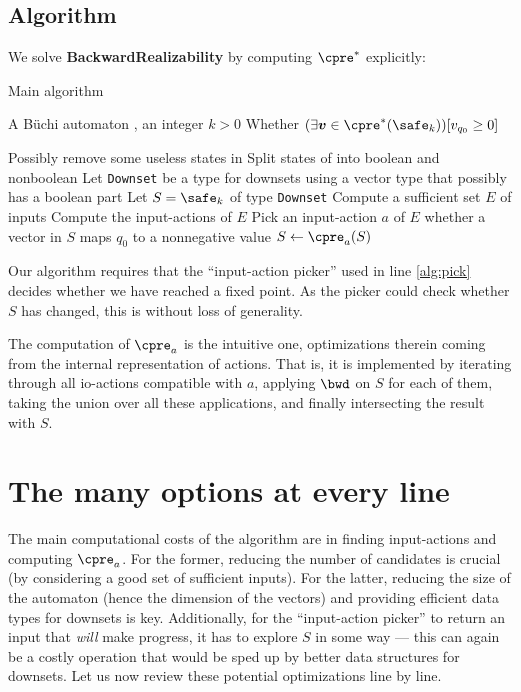 \documentclass[runningheads,a4paper]{llncs}
\begin{document}
\subsection{Algorithm}\label{sec:algo}

We
solve \textbf{BackwardRealizability} by computing
\(\cpre^*\) explicitly:

\begin{algorithm}
\caption{Main algorithm}\label{main_algo}
\alginput A Büchi automaton \cA, an integer \(k > 0\)
\algoutput Whether \((\exists \vec{v} \in  \cpre^*(\safe_k))[v_{q_0} \geq 0]\)
\begin{algorithmic}[1]
\State Possibly remove some useless states in \cA\label{alg:preproc}
\State Split states of \cA into boolean and nonboolean\label{alg:bool}
\State Let \texttt{Downset} be a type for downsets using a vector type that possibly has a
boolean part\label{alg:types}
\State Let \(S = \safe_k\) of type \texttt{Downset}
\State Compute a sufficient set \(E\) of  inputs\label{alg:inputs}
\State Compute the input-actions of \(E\)\label{alg:actions}
  \State Pick an input-action \(a\) of \(E\)\label{alg:pick}
    \State \Return whether a vector in \(S\) maps \(q_0\) to a nonnegative value
  \EndIf
  \State \(S \leftarrow \cpre_a (S)\)
\EndWhile
\end{algorithmic}
\end{algorithm}

Our algorithm requires that the ``input-action picker'' used in line \ref{alg:pick}
decides whether we have reached a fixed point.  As the picker could check
whether \(S\) has changed, this is without loss of generality.

The computation of \(\cpre_a\) is the intuitive one, optimizations therein coming
from the internal representation of actions.  That is, it is implemented by
iterating through all io-actions compatible with \(a\), applying \(\bwd\) on
\(S\) for each of them, taking the union over all these applications, and finally
intersecting the result with \(S\).

\section{The many options at every line}\label{sec:implem}

The main computational costs of the algorithm are in finding input-actions and
computing \(\cpre_a\).  For the former, reducing the number of candidates is
crucial (by considering a good set of sufficient inputs).  For the latter,
reducing the size of the automaton (hence the dimension of the vectors) and
providing efficient data types for downsets is key.  Additionally, for the
``input-action picker'' to return an input that \emph{will} make progress, it
has to explore \(S\) in some way --- this can again be a costly operation that would
be sped up by better data structures for downsets.  Let us now review these
potential optimizations line by line.
\end{document}
